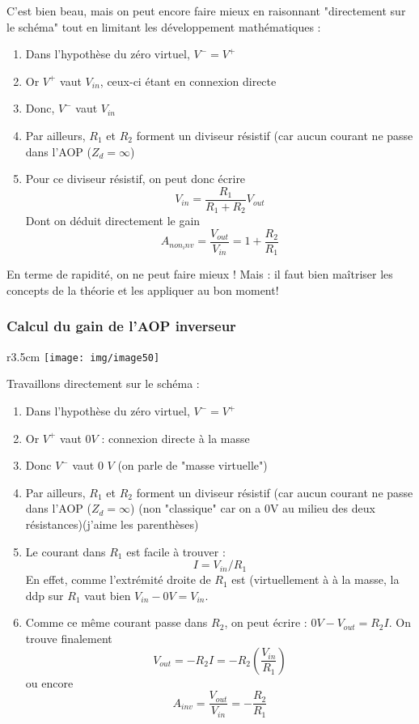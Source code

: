 C'est bien beau, mais on peut encore faire mieux en raisonnant "directement sur le schéma" tout en limitant les développement mathématiques :
\begin{enumerate}
\item Dans l'hypothèse du zéro virtuel, $V^- = V^+$
\item Or $V^+$ vaut $V_{in}$, ceux-ci étant en connexion directe
\item Donc, $V^-$ vaut $V_{in}$
\item Par ailleurs, $R_1$ et $R_2$ forment un diviseur résistif (car aucun courant ne passe dans l'AOP ($Z_d = \infty$)
\item Pour ce diviseur résistif, on peut donc écrire
\begin{equation}
V_{in} = \frac{R_1}{R_1+R_2}V_{out}
\end{equation}
Dont on déduit directement le gain
\begin{equation}
A_{non_inv} = \frac{V_{out}}{V_{in}} = 1+\frac{R_2}{R_1}
\end{equation}
\end{enumerate}

En terme de rapidité, on ne peut faire mieux ! Mais : il faut bien maîtriser les concepts de la théorie et les appliquer au bon moment! 

\subsubsection{Calcul du gain de l'AOP inverseur}
\begin{wrapfigure}[8]{r}{3.5cm}
\texttt{[image: img/image50]}
\end{wrapfigure}
Travaillons directement sur le schéma :
\begin{enumerate}
\item Dans l'hypothèse du zéro virtuel, $V^- = V^+$
\item Or $V^+$ vaut $0V$ : connexion directe à la masse
\item Donc $V^-$ vaut 0 $V$ (on parle de "masse virtuelle")
\item Par ailleurs, $R_1$ et $R_2$ forment un diviseur résistif (car aucun courant ne passe dans l'AOP ($Z_d = \infty$) (non "classique" car on a 0V au milieu des deux résistances)(j'aime les parenthèses)
\item Le courant dans $R_1$ est facile à trouver :
\begin{equation}
I = V_{in}/R_1
\end{equation}
En effet, comme l'extrémité droite de $R_1$ est (virtuellement à à la masse, la ddp sur $R_1$ vaut bien $V_{in}-0V = V_{in}$.
\item Comme ce même courant passe dans $R_2$, on peut écrire : $0V-V_{out} = R_2I$. On trouve finalement
\begin{equation}
V_{out} = -R_2I = -R_2\left(\frac{V_{in}}{R_1}\right)
\end{equation}
ou encore
\begin{equation}
A_{inv} = \frac{V_{out}}{V_{in}} = - \frac{R_2}{R_1}
\end{equation}
\end{enumerate}


